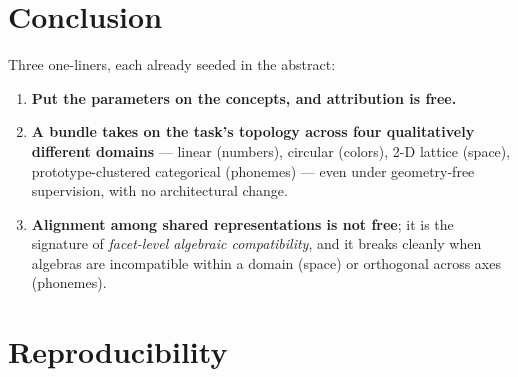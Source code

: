 \medskip

\section{Conclusion}

Three one-liners, each already seeded in the abstract:

\begin{enumerate}
\def\labelenumi{\arabic{enumi}.}
\tightlist
\item
  \textbf{Put the parameters on the concepts, and attribution is free.}
\item
  \textbf{A bundle takes on the task's topology across four qualitatively
  different domains} --- linear (numbers), circular (colors), 2-D
  lattice (space), prototype-clustered categorical (phonemes) ---
  even under geometry-free supervision, with no architectural change.
\item
  \textbf{Alignment among shared representations is not free}; it is the
  signature of \emph{facet-level algebraic compatibility}, and it breaks
  cleanly when algebras are incompatible within a domain (space) or
  orthogonal across axes (phonemes).
\end{enumerate}

\medskip

\section{Reproducibility}

